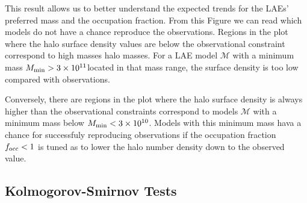 \documentclass[usenatbib]{mn2e}
\newcommand{\hMsun}{{\ifmmode{h^{-1}{\rm {M_{\odot}}}}\else{$h^{-1}{\rm{M_{\odot}}}$}\fi}}
\begin{document}
This result allows us to better understand the
expected trends for the LAEs' preferred mass and the occupation
fraction.  From this Figure we can read which models do not have a
chance reproduce the
observations. Regions in the plot where the halo surface density
values are below the observational constraint correspond to high
masses halo masses. For a LAE model ${\mathcal M}$ with a minimum mass
$M_{\rm   min}> 3 \times 10^{11}$\hMsun located in that mass range,
the surface density is too low compared with observations. 

Conversely, there are regions in the plot where the halo surface
density is always higher than the observational constraints correspond
to models ${\mathcal M}$ with a minimum mass below $M_{\rm min}<
3\times 10^{10}$\hMsun. Models with this minimum mass hava a chance
for successfuly reproducing observations if the occupation fraction
$f_{\rm occ}<1$ is tuned as to lower the halo number density down to
the observed value.    

\subsection{Kolmogorov-Smirnov Tests}
\end{document}
